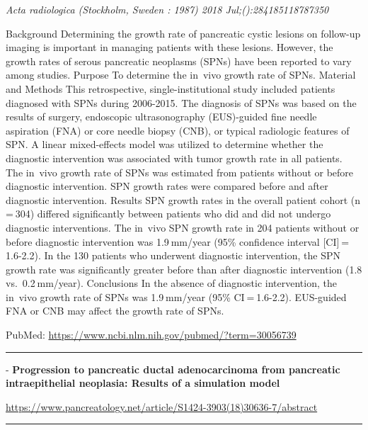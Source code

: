 \documentclass[]{article}
\begin{document}
\emph{Acta radiologica (Stockholm, Sweden : 1987) 2018
Jul;():284185118787350}

Background Determining the growth rate of pancreatic cystic lesions on
follow-up imaging is important in managing patients with these lesions.
However, the growth rates of serous pancreatic neoplasms (SPNs) have
been reported to vary among studies. Purpose To determine the in~vivo
growth rate of SPNs. Material and Methods This retrospective,
single-institutional study included patients diagnosed with SPNs during
2006-2015. The diagnosis of SPNs was based on the results of surgery,
endoscopic ultrasonography (EUS)-guided fine needle aspiration (FNA) or
core needle biopsy (CNB), or typical radiologic features of SPN. A
linear mixed-effects model was utilized to determine whether the
diagnostic intervention was associated with tumor growth rate in all
patients. The in~vivo growth rate of SPNs was estimated from patients
without or before diagnostic intervention. SPN growth rates were
compared before and after diagnostic intervention. Results SPN growth
rates in the overall patient cohort (n = 304) differed significantly
between patients who did and did not undergo diagnostic interventions.
The in~vivo SPN growth rate in 204 patients without or before diagnostic
intervention was 1.9 mm/year (95\% confidence interval
{[}CI{]} = 1.6-2.2). In the 130 patients who underwent diagnostic
intervention, the SPN growth rate was significantly greater before than
after diagnostic intervention (1.8 vs.~0.2 mm/year). Conclusions In the
absence of diagnostic intervention, the in~vivo growth rate of SPNs was
1.9 mm/year (95\% CI = 1.6-2.2). EUS-guided FNA or CNB may affect the
growth rate of SPNs.

PubMed: \url{https://www.ncbi.nlm.nih.gov/pubmed/?term=30056739}

{}

{}

\begin{center}\rule{0.5\linewidth}{\linethickness}\end{center}

 - \textbf{Progression to pancreatic ductal adenocarcinoma from
pancreatic intraepithelial neoplasia: Results of a simulation model}

\url{https://www.pancreatology.net/article/S1424-3903(18)30636-7/abstract}

\begin{center}\rule{0.5\linewidth}{\linethickness}\end{center}
\end{document}

